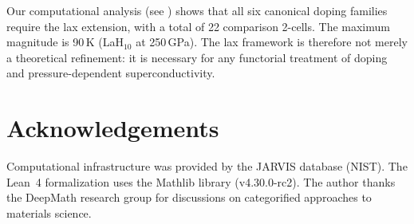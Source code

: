 \documentclass[12pt,a4paper]{article}
\theoremstyle{plain}
\theoremstyle{definition}
\theoremstyle{remark}
\begin{document}
Our computational analysis (see ) shows that
all six canonical doping families require the lax extension, with a total
of 22 comparison 2-cells.  The maximum magnitude is 90\,K
(LaH$_{10}$ at 250\,GPa).  The lax framework is therefore not merely a
theoretical refinement: it is necessary for any functorial treatment of
doping and pressure-dependent superconductivity.


\section*{Acknowledgements}

Computational infrastructure was provided by the JARVIS database
(NIST).  The Lean~4 formalization uses the Mathlib library (v4.30.0-rc2).
The author thanks the DeepMath research group for discussions on
categorified approaches to materials science.
\end{document}
